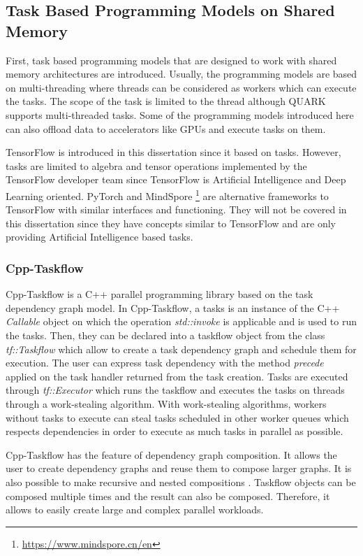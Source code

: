\subsection{Task Based Programming Models on Shared Memory}
First, task based programming models that are designed to work with shared memory architectures are introduced.
Usually, the programming models are based on multi-threading where threads can be considered as workers which can execute the tasks.
The scope of the task is limited to the thread although QUARK \cite{YarkKD2011} supports multi-threaded tasks.
Some of the programming models introduced here can also offload data to accelerators like GPUs and execute tasks on them.

TensorFlow \cite{AABBC2016} is introduced in this dissertation since it based on tasks.
However, tasks are limited to algebra and tensor operations implemented by the TensorFlow developer team since TensorFlow is Artificial Intelligence and Deep Learning oriented.
PyTorch \cite{PGMLB2019} and MindSpore \footnote{\url{https://www.mindspore.cn/en}} are alternative frameworks to TensorFlow with similar interfaces and functioning.
They will not be covered in this dissertation since they have concepts similar to TensorFlow and are only providing Artificial Intelligence based tasks.

\subsubsection{Cpp-Taskflow}
Cpp-Taskflow \cite{LiHGW2019a} \cite{HuLGW2019} is a C++ parallel programming library based on the task dependency graph model.
In Cpp-Taskflow, a tasks is an instance of the C++ \textit{Callable} object on which the operation \textit{std::invoke} is applicable and is used to run the tasks.
Then, they can be declared into a taskflow object from the class \textit{tf::Taskflow} which allow to create a task dependency graph and schedule them for execution.
The user can express task dependency with the method \textit{precede} applied on the task handler returned from the task creation.
Tasks are executed through \textit{tf::Executor} which runs the taskflow and executes the tasks on threads through a work-stealing algorithm.
With work-stealing algorithms, workers without tasks to execute can steal tasks scheduled in other worker queues which respects dependencies in order to execute as much tasks in parallel as possible.

Cpp-Taskflow has the feature of dependency graph composition.
It allows the user to create dependency graphs and reuse them to compose larger graphs.
It is also possible to make recursive and nested compositions \cite{LiHGW2019b}.
Taskflow objects can be composed multiple times and the result can also be composed.
Therefore, it allows to easily create large and complex parallel workloads.

